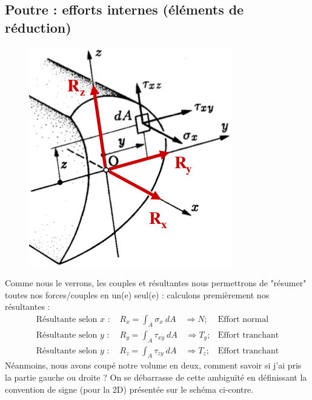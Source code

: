 	\subsection{Poutre : efforts internes (éléments de réduction)}
	\begin{figure}
	\vspace{-5mm}
	\includegraphics[scale=0.35]{ch2/image6.png}
	\end{figure}	
	Comme nous le verrons, les couples et résultantes nous permettrons 
	de "résumer" toutes nos forces/couples en un(e) seul(e) : calculons 
	premièrement nos résultantes :
	\begin{equation}
	\begin{array}{lll}
	\text{Résultante selon $x$ : } & \displaystyle R_x = \int_A\sigma_x\ dA 
	\quad\Rightarrow N; & \text{Effort normal}\\
	\text{Résultante selon $y$ : } & \displaystyle R_y = \int_A\tau_{xy}\ dA 
	\quad\Rightarrow T_y; & \text{Effort tranchant}	\\
	\text{Résultante selon $y$ : } & \displaystyle R_z = \int_A\tau_{zy}\ dA 
	\quad\Rightarrow T_z ;& \text{Effort tranchant}		
	\end{array}
	\end{equation}
	Néanmoins, nous avons coupé notre volume en deux, comment savoir si j'ai 
	pris la partie gauche ou droite ? On se débarrasse de cette ambiguïté en 
	définissant la convention de signe (pour la 2D) présentée sur le schéma 
	ci-contre.\\
	
